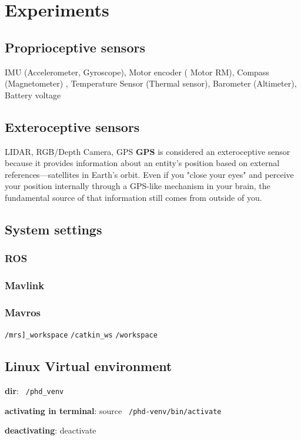 \chapter{Experiments}



\section{Proprioceptive sensors} IMU (Accelerometer, Gyroscope), Motor encoder (	Motor RM), Compass (Magnetometer) , Temperature Sensor (Thermal sensor), Barometer (Altimeter), Battery voltage

\section{Exteroceptive sensors} LIDAR, RGB/Depth Camera, GPS
    \textbf{GPS} is considered an exteroceptive sensor because it provides information about an entity’s position based on external references—satellites in Earth's orbit. Even if you "close your eyes" and perceive your position internally through a GPS-like mechanism in your brain, the fundamental source of that information still comes from outside of you.


\section{System settings}
    \subsection{ROS}
    \subsection{Mavlink}
    \subsection{Mavros}
        \texttt{/mrs]\_workspace}
        \texttt{/catkin\_ws}
        \texttt{/workspace}

\section{Linux Virtual environment}
    \textbf{dir}: \texttt{~/phd\_venv}

    \textbf{activating in terminal}: source \texttt{~/phd-venv/bin/activate}

    \textbf{deactivating}: deactivate

